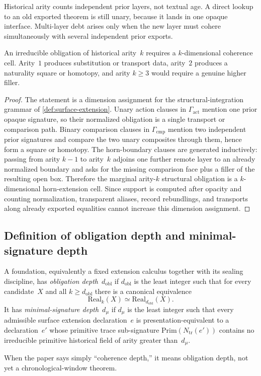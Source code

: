 \documentclass{lmcs}
\newcommand{\Real}{\mathrm{Real}}
\newcommand{\Prim}{\mathrm{Prim}}
\begin{document}
\begin{rem}
\label{rem:deep-lookups}
Historical arity counts independent prior layers, not textual age. A direct lookup to an old exported theorem is still unary, because it lands in one opaque interface. Multi-layer debt arises only when the new layer must cohere simultaneously with several independent prior exports.
\end{rem}

\begin{lem}
\label{lem:arity-dimension}
An irreducible obligation of historical arity~$k$ requires a $k$-dimensional coherence cell. Arity~$1$ produces substitution or transport data, arity~$2$ produces a naturality square or homotopy, and arity $k \geq 3$ would require a genuine higher filler.
\end{lem}

\begin{proof}
The statement is a dimension assignment for the structural-integration grammar of \autoref{def:surface-extension}. Unary action clauses in $\Gamma_{\mathrm{act}}$ mention one prior opaque signature, so their normalized obligation is a single transport or comparison path. Binary comparison clauses in $\Gamma_{\mathrm{cmp}}$ mention two independent prior signatures and compare the two unary composites through them, hence form a square or homotopy. The horn-boundary clauses are generated inductively: passing from arity $k-1$ to arity~$k$ adjoins one further remote layer to an already normalized boundary and asks for the missing comparison face plus a filler of the resulting open box. Therefore the marginal arity-$k$ structural obligation is a $k$-dimensional horn-extension cell. Since support is computed after opacity and counting normalization, transparent aliases, record rebundlings, and transports along already exported equalities cannot increase this dimension assignment.
\end{proof}

\subsection{Definition of obligation depth and minimal-signature depth}

\begin{defi}
\label{def:depth}
A foundation, equivalently a fixed extension calculus together with its sealing discipline, has \emph{obligation depth}~$d_{\mathrm{obl}}$ if $d_{\mathrm{obl}}$ is the least integer such that for every candidate~$X$ and all $k \geq d_{\mathrm{obl}}$ there is a canonical equivalence
\[
  \Real_k(X) \simeq \Real_{d_{\mathrm{obl}}}(X).
\]
It has \emph{minimal-signature depth}~$d_\mu$ if $d_\mu$ is the least integer such that every admissible surface extension declaration~$e$ is presentation-equivalent to a declaration~$e'$ whose primitive trace sub-signature $\Prim(N_{\mathrm{tr}}(e'))$ contains no irreducible primitive historical field of arity greater than~$d_\mu$.

When the paper says simply ``coherence depth,'' it means obligation depth, not yet a chronological-window theorem.
\end{defi}
\end{document}
